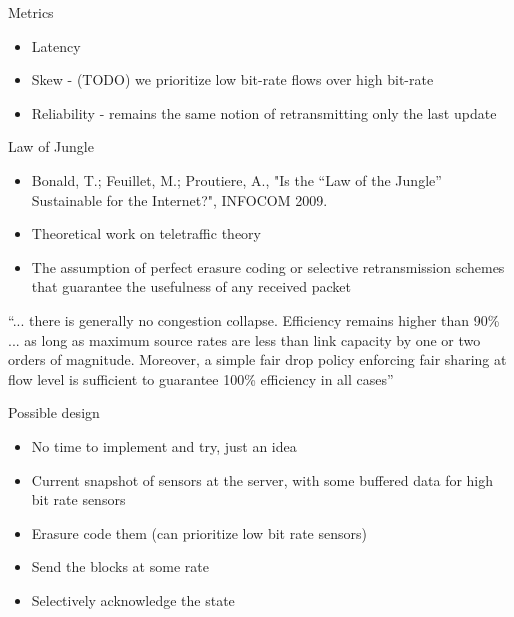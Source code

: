 \documentclass{beamer}
\begin{document}
\begin{frame}{Metrics}
    \begin{itemize}
        \item Latency
        \item Skew - (TODO) we prioritize low bit-rate flows over high bit-rate
        \item Reliability - remains the same notion of retransmitting only the last update
    \end{itemize}
\end{frame}

\begin{frame}{Law of Jungle}
    \begin{itemize}
        \item Bonald, T.; Feuillet, M.; Proutiere, A., "Is the ``Law of the Jungle''
              Sustainable for the Internet?", INFOCOM 2009.
        \item Theoretical work on teletraffic theory
        \item The assumption of perfect erasure coding or selective retransmission schemes
              that guarantee the usefulness of any received packet
    \end{itemize}

``... there is generally no congestion collapse.  Efficiency remains higher than 90\% ...
as long as maximum source rates are less than link capacity by
one or two orders of magnitude. Moreover, a simple fair drop
policy enforcing fair sharing at flow level is sufficient to guarantee
100\% efficiency in all cases''

\end{frame}

\begin{frame}{Possible design}
    \begin{itemize}
        \item No time to implement and try, just an idea
        \item Current snapshot of sensors at the server, with some buffered data
              for high bit rate sensors
        \item Erasure code them (can prioritize low bit rate sensors)
        \item Send the blocks at some rate
        \item Selectively acknowledge the state
    \end{itemize}
\end{frame}
\end{document}

